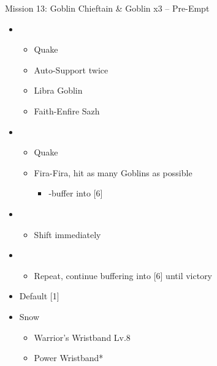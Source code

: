 \begin{battle}{Mission 13: Goblin Chieftain \& Goblin x3 -- Pre-Empt}
	\begin{itemize}
		\item \third
			\begin{itemize}
				\item Quake
				\item Auto-Support twice
				\item Libra Goblin
				\item Faith-Enfire Sazh
			\end{itemize}
		\item \second
			\begin{itemize}
				\item Quake
				\item Fira-Fira, hit as many Goblins as possible
					\begin{itemize}
						\item \com-buffer into [6]
					\end{itemize}
			\end{itemize}
		\item \sixth
			\begin{itemize}
				\item Shift immediately
			\end{itemize}
		\item \second
			\begin{itemize}
				\item Repeat, continue buffering into [6] until victory
			\end{itemize}
	\end{itemize}
\end{battle}

\begin{menu}
	\begin{itemize}
		\paradigm
		\begin{itemize}
			\item Default [1]
		\end{itemize}
		\equip
		\begin{itemize}
			\item Snow
			      \begin{itemize}
				      \item Warrior's Wristband Lv.8
				      \item Power Wristband*
			      \end{itemize}
		\end{itemize}
	\end{itemize}
\end{menu}

